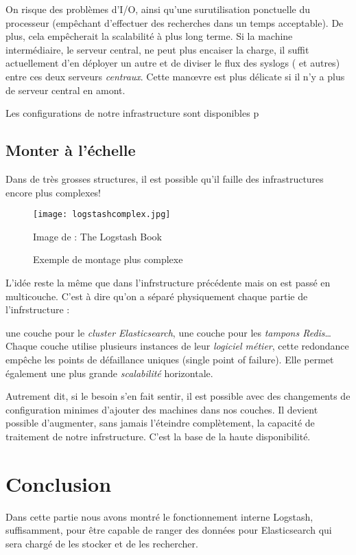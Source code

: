 On risque des problèmes d'I/O, ainsi qu'une surutilisation ponctuelle du processeur
(empêchant d'effectuer des recherches dans un temps acceptable).
De plus, cela empêcherait la scalabilité à plus long terme. 
Si la machine intermédiaire, le serveur central, ne peut plus encaiser la charge, 
il suffit actuellement d'en déployer un autre et de diviser le flux des syslogs (
et autres) entre ces deux serveurs \textit{centraux}. Cette manœvre est plus délicate 
si il n'y a plus de serveur central en amont.

Les configurations de notre infrastructure sont disponibles p\pageref{sec:codeprod}


\subsection{Monter à l'échelle}
Dans de très grosses structures, il est possible qu'il faille des infrastructures
encore plus complexes!

\begin{figure}[H]
\center
\texttt{[image: logstashcomplex.jpg]}
\label{fig:logstashcomplex}
\caption{Exemple de montage plus complexe}
{\footnotesize Image de : The Logstash Book}
\end{figure}

L'idée reste la même que dans l'infrstructure précédente mais on est passé en multicouche.
C'est à dire qu'on a séparé physiquement chaque partie de l'infrstructure : 

une couche pour le \textit{cluster Elasticsearch}, une couche pour les \textit{tampons Redis}\ldots
Chaque couche utilise plusieurs instances de leur \textit{logiciel métier}, cette redondance empêche les
points de défaillance uniques (single point of failure). Elle permet également une
plus grande \textit{scalabilité} horizontale. 

Autrement dit, si le besoin s'en fait
sentir, il est possible avec des changements de configuration minimes d'ajouter
des machines dans nos couches. Il devient possible d'augmenter, sans jamais l'éteindre
complètement, la capacité de traitement de notre infrstructure. C'est la base de la
haute disponibilité.


\section{Conclusion}
Dans cette partie nous avons montré le fonctionnement interne Logstash, suffisamment, 
pour être capable de ranger des données pour Elasticsearch qui sera chargé de les stocker
et de les rechercher.


